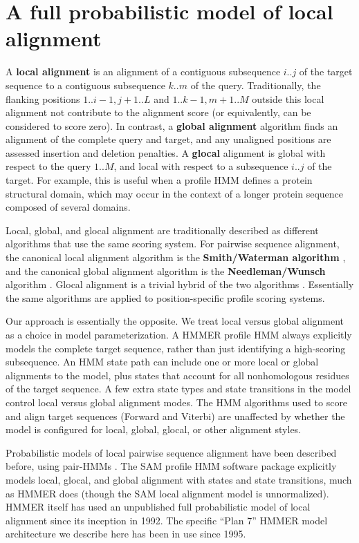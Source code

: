 \documentclass[11pt]{article}
\begin{document}
\section{A full probabilistic model of local alignment}

A \textbf{local alignment} is an alignment of a contiguous subsequence
$i..j$ of the target sequence to a contiguous subsequence $k..m$ of
the query. Traditionally, the flanking positions $1..i-1,j+1..L$ and
$1..k-1,m+1..M$ outside this local alignment not contribute to the
alignment score (or equivalently, can be considered to score zero).
In contrast, a \textbf{global alignment} algorithm finds an alignment
of the complete query and target, and any unaligned positions are
assessed insertion and deletion penalties. A \textbf{glocal} alignment
is global with respect to the query $1..M$, and local with respect to
a subsequence $i..j$ of the target. For example, this is useful when a
profile HMM defines a protein structural domain, which may occur in
the context of a longer protein sequence composed of several domains.

Local, global, and glocal alignment are traditionally described as
different algorithms that use the same scoring system.  For pairwise
sequence alignment, the canonical local alignment algorithm is the
\textbf{Smith/Waterman algorithm} \citep{Smith81}, and the canonical
global alignment algorithm is the \textbf{Needleman/Wunsch} algorithm
\citep{Needleman70}. Glocal alignment is a trivial hybrid of the two
algorithms \citep{Durbin98}. Essentially the same algorithms are
applied to position-specific profile scoring systems.

Our approach is essentially the opposite. We treat local versus global
alignment as a choice in model parameterization. A HMMER profile HMM
always explicitly models the complete target sequence, rather than
just identifying a high-scoring subsequence. An HMM state path can
include one or more local or global alignments to the model, plus
states that account for all nonhomologous residues of the target
sequence. A few extra state types and state transitions in the model
control local versus global alignment modes. The HMM algorithms used
to score and align target sequences (Forward and Viterbi) are
unaffected by whether the model is configured for local, global,
glocal, or other alignment styles.

Probabilistic models of local pairwise sequence alignment have been
described before, using pair-HMMs \citep{Durbin98,XXX}. The SAM
profile HMM software package explicitly models local, glocal, and
global alignment with states and state transitions, much as HMMER does
(though the SAM local alignment model is unnormalized). HMMER itself
has used an unpublished full probabilistic model of local alignment
since its inception in 1992. The specific ``Plan 7'' HMMER model
architecture we describe here has been in use since 1995. 
\end{document}
